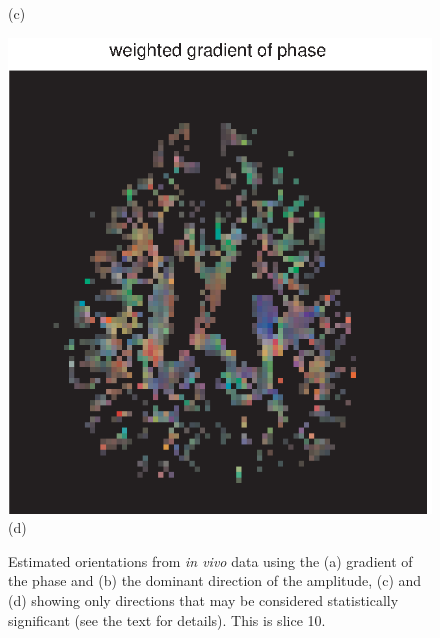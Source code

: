 \documentclass[authoryear,preprint,12pt]{elsarticle}
\begin{document}
\begin{figure}[p]
\begin{center}
\begin{minipage}[]{.42\textwidth}
       (c)
      \end{minipage}
      \begin{minipage}[]{.42\textwidth}
      \centering
      \includegraphics[width=\textwidth]{1gradphase55d.eps}
      (d)
    \end{minipage}
  \end{center}
  \caption{Estimated orientations from {\em in vivo} data using the
    (a) gradient of the phase and (b) the dominant direction of the
    amplitude, (c) and (d) showing only directions that may be
    considered statistically significant (see the text for
    details). This is slice 10.}
  \label{fig1} 
\end{figure}
\end{document}
